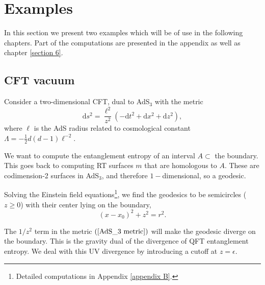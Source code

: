 \section{Examples}

In this section we present two examples which will be of use in the following chapters. Part of the computations are presented in the appendix as well as chapter \ref{section 6}.

\subsection{CFT vacuum}

Consider a two-dimensional CFT, dual to AdS$_3$ with the metric
\begin{equation}\label{AdS_3 metric}
    \text{d}s^2= \frac{\ell^2}{z^2}\left(-\text{d}t^2+\text{d}x^2+\text{d}z^2\right),
\end{equation}
where $\ell$ is the AdS radius related to cosmological constant $\Lambda = -\frac{1}{2}d(d-1)\ell^{-2}$.

We want to compute the entanglement entropy of an interval $A\subset$ the boundary. This goes back to computing RT surfaces $m$ that are homologous to $A$. These are codimension-2 surfaces in AdS$_3$, and therefore $1-$dimensional, so a geodesic.

Solving the Einstein field equations\footnote{Detailed computations in Appendix \ref{appendix B}.}, we find the geodesics to be semicircles ($z\geq 0$) with their center lying on the boundary,
\begin{equation}\label{AdS_3 vaccum geodesic}
    \left(x-x_0\right)^2+z^2=r^2.
\end{equation}

The $1/z^2$ term in the metric $\left(\ref{AdS_3 metric}\right)$ will make the geodesic diverge on the boundary. This is the gravity dual of the divergence of QFT entanglement entropy. We deal with this UV divergence by introducing a cutoff at $z=\epsilon$.


